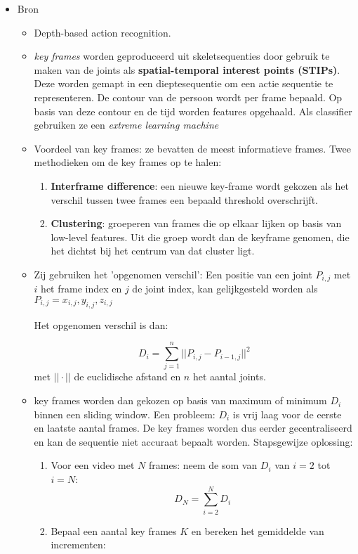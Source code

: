 \begin{itemize}
	\item Bron \cite{Action-Recognition-using-Key-Frame-Features-of-Depth-Sequence-and-ELM}
	\begin{itemize}
		\item Depth-based action recognition.
		\item \textit{key frames} worden geproduceerd uit skeletsequenties door gebruik te maken van de joints als \textbf{spatial-temporal interest points (STIPs)}. Deze worden gemapt in een dieptesequentie om een actie sequentie te representeren. De contour van de persoon wordt per frame bepaald. Op basis van deze contour en de tijd worden features opgehaald. Als classifier gebruiken ze een \textit{extreme learning machine}
		\item Voordeel van key frames: ze bevatten de meest informatieve frames. Twee methodieken om de key frames op te halen:
		\begin{enumerate}
			\item \textbf{Interframe difference}: een nieuwe key-frame wordt gekozen als het verschil tussen twee frames een bepaald threshold overschrijft.
			\item \textbf{Clustering}: groeperen van frames die op elkaar lijken op basis van low-level features. Uit die groep wordt dan de keyframe genomen, die het dichtst bij het centrum van dat cluster ligt.
		\end{enumerate}
		\item Zij gebruiken het 'opgenomen verschil': Een positie van een joint $P_{i,j}$ met $i$ het frame index en $j$ de joint index, kan gelijkgesteld worden als  $P_{i, j} = {x_{i, j}, y_{i, j}, z_{i, j}}$
		
		Het opgenomen verschil is dan:
		
		$$D_i = \sum_{j = 1}^{n} || P_{i, j} - P_{i - 1, j}||^2$$
		met $||\cdot||$ de euclidische afstand en $n$ het aantal joints.
		
		\item key frames worden dan gekozen op basis van maximum of minimum $D_i$ binnen een sliding window. Een probleem: $D_i$ is vrij laag voor de eerste en laatste aantal frames. De key frames worden dus eerder gecentraliseerd en kan de sequentie niet accuraat bepaalt worden. Stapsgewijze oplossing:
		\begin{enumerate}
			\item Voor een video met $N$ frames: neem de som van $D_i$ van $i = 2$ tot $i = N$:
			$$D_N = \sum_{i = 2}^{N}D_i$$
			\item Bepaal een aantal key frames $K$ en bereken het gemiddelde van incrementen:
			

\end{enumerate}
\end{itemize}
\end{itemize}

